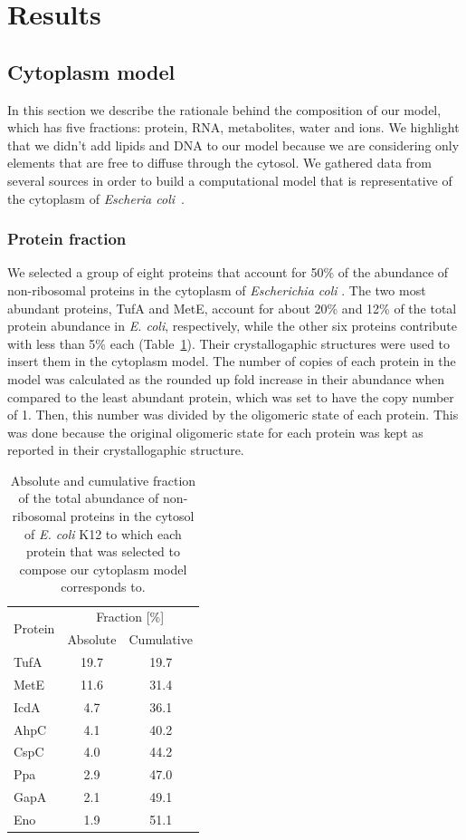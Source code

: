 \documentclass[journal=jacsat,manuscript=article]{achemso}
\begin{document}
\section*{Results}

\subsection{Cytoplasm model}
In this section we describe the rationale behind the composition of our model, which has five fractions: protein, RNA, metabolites, water and ions. We highlight that we didn't add lipids and DNA to our model because we are considering only elements that are free to diffuse through the cytosol. We gathered data from several sources in order to build a computational model that is representative of the cytoplasm of {\em Escheria coli}~\cite{Dong1996,Bennett2009,Link1997,Mcguffee2010}.

\subsubsection{Protein fraction}
We selected a group of eight proteins that account for 50\% of the abundance of non-ribosomal proteins in the cytoplasm of {\em Escherichia coli} \cite{Link1997}. The two most abundant proteins, TufA and MetE, account for about 20\% and 12\% of the total protein abundance in {\em E. coli}, respectively, while the other six proteins contribute with less than 5\% each (Table~\ref{tbl:protein_fraction}). Their crystallogaphic structures were used to insert them in the cytoplasm model. The number of copies of each protein in the model was calculated as the rounded up fold increase in their abundance when compared to the least abundant protein, which was set to have the copy number of 1. Then, this number was divided by the oligomeric state of each protein. This was done because the original oligomeric state for each protein was kept as reported in their crystallogaphic structure.

\begin{table}[H]
\centering
\begin{tabular}{ l c c }
\hline
\multirow{2}{*}{Protein} & 	\multicolumn{2}{c}{Fraction [\%]} \\
& Absolute & Cumulative \\ 
\hline
TufA & 19.7 & 19.7 \\
MetE & 11.6 & 31.4 \\
IcdA & 4.7  & 36.1 \\
AhpC & 4.1  & 40.2 \\
CspC & 4.0  & 44.2 \\
Ppa  & 2.9  & 47.0 \\
GapA & 2.1  & 49.1 \\
Eno  & 1.9  & 51.1 \\
\hline
\end{tabular}
\caption{Absolute and cumulative fraction of the total abundance of non-ribosomal proteins in the cytosol of {\em E. coli} K12 to which each protein that was selected to compose our cytoplasm model corresponds to.}
\label{tbl:protein_fraction}
\end{table}
\end{document}
